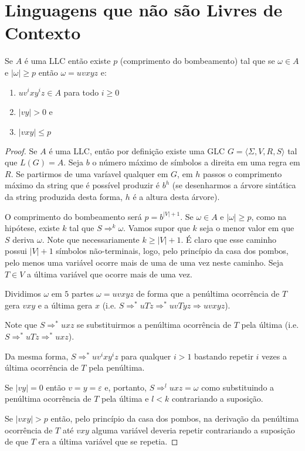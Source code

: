 \section{Linguagens que não são Livres de Contexto}
\label{sec:lnlc}


\begin{lemma}
  Se $A$ é uma LLC então existe $p$ (comprimento do bombeamento) tal que se $\omega \in A$ e $|\omega| \geq p$ então $\omega = uvxyz$ e:
  \begin{enumerate}
  \item $uv^ixy^iz \in A$ para todo $i \geq 0$
  \item $|vy| > 0$ e
  \item $|vxy| \leq p$
  \end{enumerate}
\end{lemma}

\begin{proof}
  Se $A$ é uma LLC, então por definição existe uma GLC $G = \langle \Sigma, V, R, S \rangle$ tal que $L(G) = A$.
  Seja $b$ o número máximo de símbolos a direita em uma regra em $R$.
  Se partirmos de uma varíavel qualquer em $G$, em $h$ passos o comprimento máximo da string que é possível produzir é $b^h$ (se desenharmos a árvore sintática da string produzida desta forma, $h$ é a altura desta árvore).
  
  O comprimento do bombeamento será $p = b^{|V| + 1}$.
  Se $\omega \in A$ e $|\omega| \geq p$, como na hipótese, existe $k$ tal que $S \Rightarrow^k \omega$. 
  Vamos supor que $k$ seja o menor valor em que $S$ deriva $\omega$.
  Note que necessariamente $k \geq |V| + 1$.
  É claro que esse caminho possui $|V|+1$ símbolos não-terminais, logo, pelo princípio da casa dos pombos, pelo menos uma variável ocorre mais de uma de uma vez neste caminho.
  Seja $T \in V$ a última variável que ocorre mais de uma vez.
  
  Dividimos $\omega$ em $5$ partes $\omega = uvxyz$ de forma que a penúltima ocorrência de $T$ gera $vxy$ e a última gera $x$ (i.e. $S \Rightarrow^* uTz \Rightarrow^* uvTyz \Rightarrow uvxyz$).


Note que $S \Rightarrow^* uxz$ se substituirmos a penúltima ocorrência de $T$ pela última (i.e. $S \Rightarrow^* uTz \Rightarrow^* uxz$).


Da mesma forma, $S \Rightarrow^* uv^ixy^iz$ para qualquer $i > 1$ bastando repetir $i$ vezes a última ocorrência de $T$ pela penúltima.


Se $|vy| = 0$ então $v = y = \varepsilon$ e, portanto, $S \Rightarrow^l uxz = \omega$ como substituindo a penúltima ocorrência de $T$ pela última e $l < k$ contrariando a suposição.

Se $|vxy| > p$ então, pelo princípio da casa dos pombos, na derivação da penúltima ocorrência de $T$ até $vxy$ alguma variável deveria repetir contrariando a suposição de que $T$ era a última variável que se repetia.
\end{proof}


